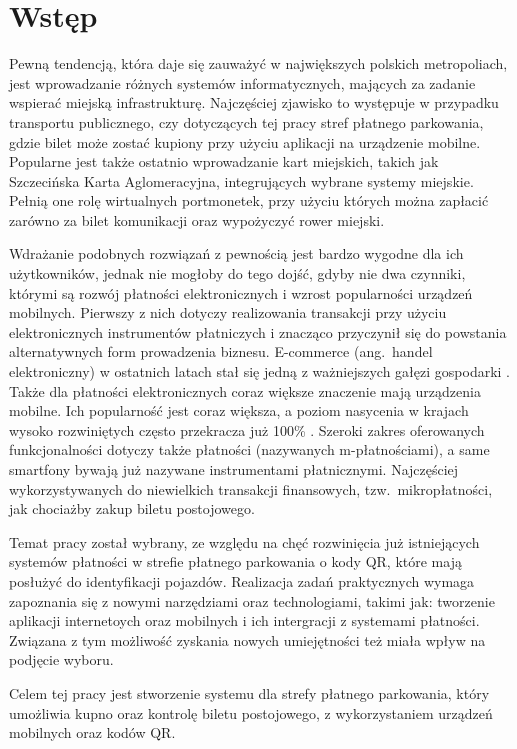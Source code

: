 \section*{Wstęp}

Pewną tendencją, która daje się zauważyć w największych polskich metropoliach, jest wprowadzanie różnych systemów informatycznych, mających za zadanie wspierać miejską infrastrukturę. Najczęściej zjawisko to występuje w przypadku transportu publicznego, czy dotyczących tej pracy stref płatnego parkowania, gdzie bilet może zostać kupiony przy użyciu aplikacji na urządzenie mobilne. Popularne jest także ostatnio wprowadzanie kart miejskich, takich jak Szczecińska Karta Aglomeracyjna, integrujących wybrane systemy miejskie. Pełnią one rolę wirtualnych portmonetek, przy użyciu których można zapłacić zarówno za bilet komunikacji oraz wypożyczyć rower miejski. 

Wdrażanie podobnych rozwiązań z pewnością jest bardzo wygodne dla ich użytkowników, jednak nie mogłoby do tego dojść, gdyby nie dwa czynniki, którymi są rozwój płatności elektronicznych i wzrost popularności urządzeń mobilnych. Pierwszy z nich dotyczy realizowania transakcji przy użyciu elektronicznych instrumentów płatniczych i znacząco przyczynił się do powstania alternatywnych form prowadzenia biznesu. E-commerce (ang.~handel elektroniczny) w ostatnich latach stał się jedną z ważniejszych gałęzi gospodarki \cite{barometr_radio}. Także dla płatności elektronicznych coraz większe znaczenie mają urządzenia mobilne. Ich popularność jest coraz większa, a poziom nasycenia w krajach wysoko rozwiniętych często przekracza już 100\% \cite{biblia_ebiznesu}. Szeroki zakres oferowanych funkcjonalności dotyczy także płatności (nazywanych m-płatnościami), a same smartfony bywają już nazywane instrumentami płatnicznymi. Najczęściej wykorzystywanych do niewielkich transakcji finansowych, tzw.~mikropłatności, jak chociażby zakup biletu postojowego. 

Temat pracy został wybrany, ze względu na chęć rozwinięcia już istniejących systemów płatności w strefie płatnego parkowania o kody QR, które mają posłużyć do identyfikacji pojazdów. Realizacja zadań praktycznych wymaga zapoznania się z nowymi narzędziami oraz technologiami, takimi jak: tworzenie aplikacji internetoych oraz mobilnych i ich intergracji z systemami płatności. Związana z tym możliwość zyskania nowych umiejętności też miała wpływ na podjęcie wyboru.

Celem tej pracy jest stworzenie systemu dla strefy płatnego parkowania, który  umożliwia kupno oraz kontrolę biletu postojowego, z wykorzystaniem urządzeń mobilnych oraz kodów QR.

